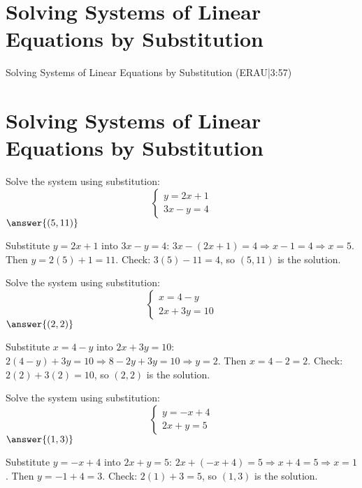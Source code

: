 \documentclass{ximera}
\begin{document}

\section*{Solving Systems of Linear Equations by Substitution}

Solving Systems of Linear Equations by Substitution (ERAU|3:57)


\section*{Solving Systems of Linear Equations by Substitution}

\begin{problem}
Solve the system using substitution:
\[
\begin{cases}
y = 2x + 1\\
3x - y = 4
\end{cases}
\]
$\answer{(5,11)}$
\begin{feedback}
Substitute $y=2x+1$ into $3x-y=4$: $3x-(2x+1)=4\Rightarrow x-1=4\Rightarrow x=5$. Then $y=2(5)+1=11$. Check: $3(5)-11=4$, so $(5,11)$ is the solution.
\end{feedback}
\end{problem}

\begin{problem}
Solve the system using substitution:
\[
\begin{cases}
x = 4 - y\\
2x + 3y = 10
\end{cases}
\]
$\answer{(2,2)}$
\begin{feedback}
Substitute $x=4-y$ into $2x+3y=10$: $2(4-y)+3y=10\Rightarrow 8-2y+3y=10\Rightarrow y=2$. Then $x=4-2=2$. Check: $2(2)+3(2)=10$, so $(2,2)$ is the solution.
\end{feedback}
\end{problem}

\begin{problem}
Solve the system using substitution:
\[
\begin{cases}
y = -x + 4\\
2x + y = 5
\end{cases}
\]
$\answer{(1,3)}$
\begin{feedback}
Substitute $y=-x+4$ into $2x+y=5$: $2x+(-x+4)=5\Rightarrow x+4=5\Rightarrow x=1$. Then $y=-1+4=3$. Check: $2(1)+3=5$, so $(1,3)$ is the solution.
\end{feedback}
\end{problem}
\end{document}
